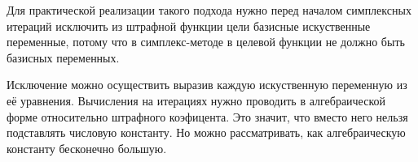 Для практической реализации такого подхода нужно перед началом симплексных итераций исключить из
штрафной функции цели базисные искуственные переменные,
потому что в симплекс-методе в целевой функции не должно быть базисных переменных.

Исключение можно осуществить выразив каждую искуственную переменную из её уравнения.
Вычисления на итерациях нужно проводить в алгебраической форме относительно штрафного коэфицента. Это значит, что вместо него нельзя подставлять числовую константу.
Но можно рассматривать, как алгебраическую константу бесконечно большую.
